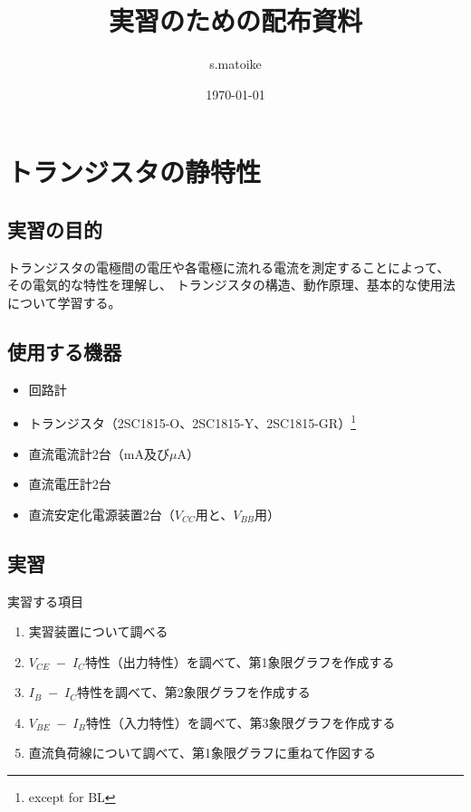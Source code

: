 \documentclass[uplatex,a4paper,11pt,oneside,openany]{jsbook}
\begin{document}
\title{実習のための配布資料}
\author{s.matoike}
\date{\today}
\maketitle

\newpage

\chapter{トランジスタの静特性}

\section{実習の目的}

トランジスタの電極間の電圧や各電極に流れる電流を測定することによって、
その電気的な特性を理解し、
トランジスタの構造、動作原理、基本的な使用法について学習する。

\section{使用する機器}

\begin{itemize}
\item 回路計
\item トランジスタ（2SC1815-O、2SC1815-Y、2SC1815-GR）\footnote{except for BL}
\item 直流電流計2台（mA及び$\mu$A）
\item 直流電圧計2台
\item 直流安定化電源装置2台（$V_{CC}$用と、$V_{BB}$用）
\end{itemize}

\section{実習}

実習する項目
\begin{enumerate}
\item[(1)] 実習装置について調べる
\item[(2)] $V_{CE}\;-\;I_C$特性（出力特性）を調べて、第1象限グラフを作成する
\item[(3)] $I_B\;-\;I_C$特性を調べて、第2象限グラフを作成する
\item[(4)] $V_{BE}\;-\;I_B$特性（入力特性）を調べて、第3象限グラフを作成する
\item[(5)] 直流負荷線について調べて、第1象限グラフに重ねて作図する
\end{enumerate}
\end{document}
